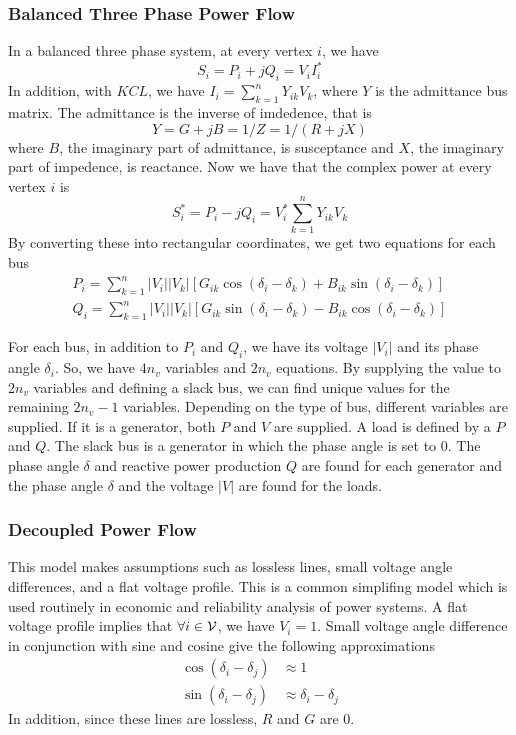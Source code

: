 \subsubsection{Balanced Three Phase Power Flow}
In a balanced three phase system, at every vertex $i$, we have
\begin{equation}
S_i = P_i + j Q_i = V_i I_i^*
\end{equation}
In addition, with $KCL$, we have $I_i = \sum_{k=1}^n Y_{ik} V_k$, where $Y$ is the admittance bus matrix.  The admittance is the inverse of imdedence, that is
\begin{equation}
Y = G + j B = 1/Z = 1/(R + jX) 
\end{equation}
where $B$, the imaginary part of admittance, is susceptance and $X$, the imaginary part of impedence, is reactance.  Now we have that the complex power at every vertex $i$ is
\begin{equation}
S_i^* = P_i - j Q_i = V_i^* \sum_{k=1}^n Y_{ik} V_k
\end{equation}
By converting these into rectangular coordinates, we get two equations for each bus
\begin{align} \label{ac-pf}
P_i = \sum_{k=1}^n |V_i| |V_k| \left[ G_{ik} \cos (\delta_i - \delta_k) + B_{ik} \sin (\delta_i - \delta_k) \right]  \\
Q_i = \sum_{k=1}^n |V_i| |V_k| \left[ G_{ik} \sin (\delta_i - \delta_k) - B_{ik} \cos (\delta_i - \delta_k) \right]  
\end{align}

For each bus, in addition to $P_i$ and $Q_i$,  we have its voltage $|V_i|$ and its phase angle $\delta_i$.  So, we have $4 n_v$ variables and $2 n_v$ equations.  By supplying the value to $2 n_v$ variables and defining a slack bus, we can find unique values for the remaining $2n_v - 1 $ variables.  Depending on the type of bus, different variables are supplied.  If it is a generator, both $P$  and $V$ are supplied.  A load is defined by a $P$ and $Q$.  The slack bus is a generator in which the phase angle is set to 0.  The phase angle $\delta$ and reactive power production $Q$ are found for each generator and the phase angle $\delta$ and the voltage $|V|$ are found for the loads.

\subsubsection{Decoupled Power Flow}
This model makes assumptions such as lossless lines, small voltage angle differences, and a flat voltage profile.  This is a common simplifing model which is used routinely in economic and reliability analysis of power systems.  A flat voltage profile implies that $\forall i \in \mathcal{V}$, we have $V_i = 1$.  Small voltage angle difference in conjunction with sine and cosine give the following approximations
\begin{align}
\cos(\delta_i - \delta_j) &\approx 1	\\
\sin(\delta_i-\delta_j) & \approx \delta_i - \delta_j
\end{align}
In addition, since these lines are lossless, $R$ and $G$ are 0.  

